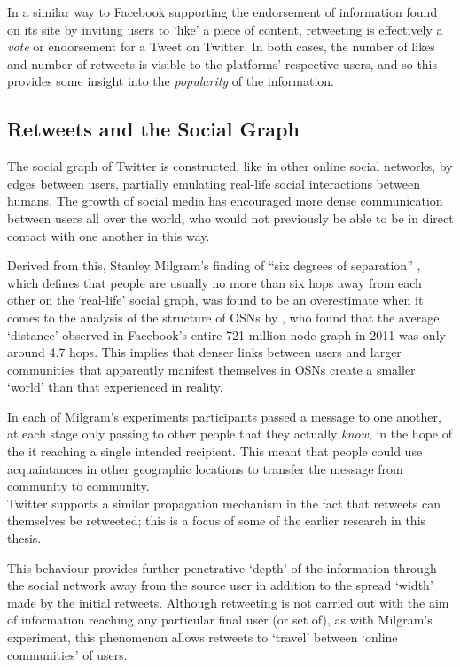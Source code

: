 In a similar way to Facebook supporting the endorsement of information found on its site by inviting users to `like' a piece of content, retweeting is effectively a \textit{vote} or endorsement for a Tweet on Twitter. In both cases, the number of likes and number of retweets is visible to the platforms' respective users, and so this provides some insight into the \textit{popularity} of the information.\\


\subsection{Retweets and the Social Graph}
The social graph of Twitter is constructed, like in other online social networks, by edges between users, partially emulating real-life social interactions between humans. The growth of social media has encouraged more dense communication between users all over the world, who would not previously be able to be in direct contact with one another in this way.

Derived from this, Stanley Milgram's finding of ``six degrees of separation'' \cite{milgram67}, which defines that people are usually no more than six hops away from each other on the `real-life' social graph, was found to be an overestimate when it comes to the analysis of the structure of OSNs by \cite{backstrom11}, who found that the average `distance' observed in Facebook's entire 721 million-node graph in 2011 was only around 4.7 hops. This implies that denser links between users and larger communities that apparently manifest themselves in OSNs create a smaller `world' than that experienced in reality.

In each of Milgram's experiments participants passed a message to one another, at each stage only passing to other people that they actually \textit{know}, in the hope of the it reaching a single intended recipient. This meant that people could use acquaintances in other geographic locations to transfer the message from community to community.\\
Twitter supports a similar propagation mechanism in the fact that retweets can themselves be retweeted; this is a focus of some of the earlier research in this thesis.

This behaviour provides further penetrative `depth' of the information through the social network away from the source user in addition to the spread `width' made by the initial retweets. Although retweeting is not carried out with the aim of information reaching any particular final user (or set of), as with Milgram's experiment, this phenomenon allows retweets to `travel' between `online communities' of users.

